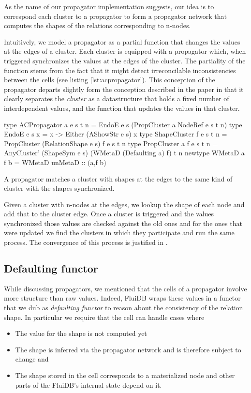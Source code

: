 As the name of our propagator implementation suggests, our idea is to
correspond each cluster to a propagator to form a propagator network
that computes the shapes of the relations corresponding to n-nodes.

Intuitively, we model a propagator as a partial function that changes
the values at the edges of a cluster. Each cluster is equipped with a
propagator which, when triggered synchronizes the values at the edges
of the cluster. The partiality of the function stems from the fact
that it might detect irreconcilable inconsistencies between the cells
(see listing \ref{lst:acpropagator}). This conception of the
propagator departs slightly form the conception described in the paper
in that it clearly separates the \emph{cluster} as a datastructure
that holds a fixed number of interdependent values, and the function
that updates the values in that cluster.

\begin{code}
  \begin{haskellcode}
    type ACPropagator a e s t n =
      EndoE e s (PropCluster a NodeRef e s t n)
    type EndoE e s x = x -> Either (AShowStr e s) x
    type ShapeCluster f e s t n =
      PropCluster (RelationShape e s) f e s t n
    type PropCluster a f e s t n =
      AnyCluster' (ShapeSym e s) (WMetaD (Defaulting a) f) t n
    newtype WMetaD a f b = WMetaD { unMetaD :: (a,f b)}
  \end{haskellcode}
  \caption{\label{lst:acpropagator}A propagator matches a cluster with
    shapes at the edges to the same kind of cluster with the shapes
    synchronized.}
\end{code}

Given a cluster with n-nodes at the edges, we lookup the shape of each
node and add that to the cluster edge.  Once a cluster is triggered
and the values synchronized those values are checked against the old
ones and for the ones that were updated we find the clusters in which
they participate and run the same process. The convergence of this
process is justified in \cite{kuperLVarsLatticebasedData2013}.

\subsection{Defaulting functor}

While discussing propagators, we mentioned that the cells of a
propagator involve more structure than raw values. Indeed, FluiDB
wraps these values in a functor that we dub as \emph{defaulting
functor} to reason about the consistency of the relation shape. In
particular we require that the cell can handle cases where
\begin{itemize}
\item The value for the shape is not computed yet
\item The shape is inferred via the propagator network and is
therefore subject to change and
\item The shape stored in the cell corresponds to a materialized node
and other parts of the FluiDB's internal state depend on it.
\end{itemize}

